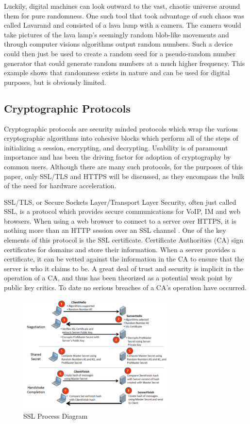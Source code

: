 \documentclass[journal]{IEEEtran}
\begin{document}
Luckily, digital machines can look outward to the vast, chaotic universe around them for pure randomness.  One such tool that took advantage of such chaos was called Lavarand and consisted of a lava lamp with a camera.  The camera would take pictures of the lava lamp's seemingly random blob-like movements and through computer visions algorithms output random numbers.  Such a device could then just be used to create a random seed for a pseudo-random number generator that could generate random numbers at a much higher frequency.  This example shows that randomness exists in nature and can be used for digital purposes, but is obviously limited.  

\subsection{Cryptographic Protocols}

Cryptographic protocols are security minded protocols which wrap the various cryptographic algorithms into cohesive blocks which perform all of the steps of initializing a session, encrypting, and decrypting.  Usability is of paramount importance and has been the driving factor for adoption of cryptography by common users.  Although there are many such protocols, for the purposes of this paper, only SSL/TLS and HTTPS will be discussed, as they encompass the bulk of the need for hardware acceleration.

SSL/TLS, or Secure Sockets Layer/Transport Layer Security, often just called SSL, is a protocol which provides secure communications for VoIP, IM and web browsers.  When using a web browser to connect to a server over HTTPS, it is nothing more than an HTTP session over an SSL channel \cite{howSSLWorks}.  One of the key elements of this protocol is the SSL certificate.  Certificate Authorities (CA) sign certificates for domains and store their information.  When a server provides a certificate, it can be vetted against the information in the CA to ensure that the server is who it claims to be.  A great deal of trust and security is implicit in the operation of a CA, and thus has been theorized as a potential weak point by public key critics.  To date no serious breaches of a CA's operation have occurred.

\begin{figure}[htbp]
	\centering
	\includegraphics[width=8cm,keepaspectratio]{img/sslDiagram.png}
	\caption{SSL Process Diagram \cite{sslImage} }
	\label{sslFigure}
\end{figure}
\end{document}
